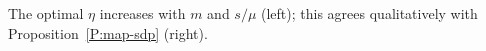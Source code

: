 \documentclass[xcolor=dvipsnames]{beamer}
\begin{document}
\begin{frame}
    \begin{center}
\begin{figure}[h]
    \vspace{-2em}
\end{figure}
  \end{center}
The optimal $\eta$ increases with $m$ and $s/\mu$ (left); this agrees
qualitatively with Proposition~\ref{P:map-sdp} (right).
\end{frame}
\end{document}
